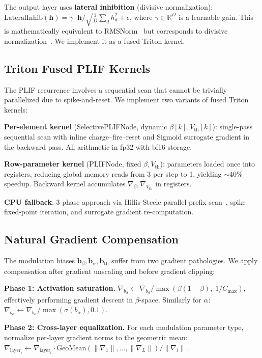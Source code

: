\documentclass{article}
\newcommand{\vth}{V_{\text{th}}}
\newcommand{\R}{\mathbb{R}}
\begin{document}
The output layer uses \textbf{lateral inhibition} (divisive normalization):
$\text{LateralInhib}(\mathbf{h}) = \gamma \cdot \mathbf{h} / \sqrt{\frac{1}{D}\sum_d h_d^2 + \epsilon}$,
where $\gamma \in \R^D$ is a learnable gain.
This is mathematically equivalent to RMSNorm~\citep{zhang2019root} but corresponds to divisive normalization~\citep{carandini2012normalization}.
We implement it as a fused Triton kernel.

\subsection{Triton Fused PLIF Kernels}
\label{sec:triton}

The PLIF recurrence involves a sequential scan that cannot be trivially parallelized due to spike-and-reset.
We implement two variants of fused Triton~\citep{tillet2019triton} kernels:

\textbf{Per-element kernel} (SelectivePLIFNode, dynamic $\beta[k], \vth[k]$): single-pass sequential scan with inline charge--fire--reset and Sigmoid surrogate gradient in the backward pass. All arithmetic in fp32 with bf16 storage.

\textbf{Row-parameter kernel} (PLIFNode, fixed $\beta, \vth$): parameters loaded once into registers, reducing global memory reads from 3 per step to 1, yielding $\sim$40\% speedup. Backward kernel accumulates $\nabla_\beta, \nabla_{\vth}$ in registers.

\textbf{CPU fallback}: 3-phase approach via Hillis-Steele parallel prefix scan~\citep{blelloch1990prefix, martin2018parallelizing}, spike fixed-point iteration, and surrogate gradient re-computation.

\subsection{Natural Gradient Compensation}
\label{sec:natural-gradient}

The modulation biases $\mathbf{b}_\beta, \mathbf{b}_\alpha, \mathbf{b}_{\text{th}}$ suffer from two gradient pathologies.
We apply compensation after gradient unscaling and before gradient clipping:

\textbf{Phase 1: Activation saturation.}
$\nabla_{b_\beta} \leftarrow \nabla_{b_\beta} / \max(\beta(1-\beta),\; 1/C_{\max})$, effectively performing gradient descent in $\beta$-space.
Similarly for $\alpha$: $\nabla_{b_\alpha} \leftarrow \nabla_{b_\alpha} / \max(\sigma(b_\alpha), 0.1)$.

\textbf{Phase 2: Cross-layer equalization.}
For each modulation parameter type, normalize per-layer gradient norms to the geometric mean:
$\nabla_{\text{layer}_i} \leftarrow \nabla_{\text{layer}_i} \cdot \text{GeoMean}(\|\nabla_1\|, \ldots, \|\nabla_L\|) / \|\nabla_i\|$.
\end{document}
